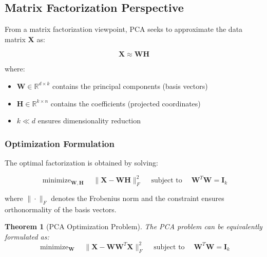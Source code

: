 \documentclass[12pt]{article}
\renewcommand{\vec}[1]{\mathbf{#1}}
\DeclareMathOperator{\minimize}{minimize}
\DeclareMathOperator{\subject}{subject\ to}
\newtheorem{theorem}{Theorem}[section]
\begin{document}
\subsection{Matrix Factorization Perspective}


From a matrix factorization viewpoint, PCA seeks to approximate the data matrix $\vec{X}$ as:

\begin{equation}
    \vec{X} \approx \vec{W}\vec{H}
\end{equation}

where:
\begin{itemize}[noitemsep]
    \item $\vec{W} \in \mathbb{R}^{d \times k}$ contains the principal components (basis vectors)
    \item $\vec{H} \in \mathbb{R}^{k \times n}$ contains the coefficients (projected coordinates)
    \item $k \ll d$ ensures dimensionality reduction
\end{itemize}

\subsubsection{Optimization Formulation}

The optimal factorization is obtained by solving:

\begin{equation}
    \minimize_{\vec{W}, \vec{H}} \quad \|\vec{X} - \vec{W}\vec{H}\|_F^2 \quad \subject \quad \vec{W}^T\vec{W} = \vec{I}_k
\end{equation}

where $\|\cdot\|_F$ denotes the Frobenius norm and the constraint ensures orthonormality of the basis vectors.

\begin{theorem}[PCA Optimization Problem] \label{thm:pca_optimization}
    The PCA problem can be equivalently formulated as:
    \begin{equation}
        \minimize_{\vec{W}} \quad \|\vec{X} - \vec{W}\vec{W}^T\vec{X}\|_F^2 \quad \subject \quad \vec{W}^T\vec{W} = \vec{I}_k
    \end{equation}
\end{theorem}
\end{document}
